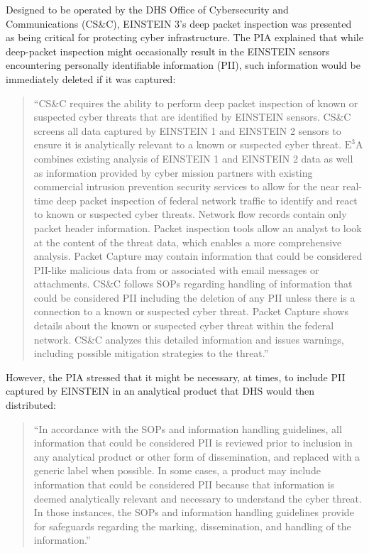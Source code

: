 \documentclass[fleqn,10pt]{wlscirep}
\newcommand{\ETA}{$\textrm{E}^\textrm{3}\textrm{A}$\xspace}
\begin{document}
Designed to be operated by the DHS Office of Cybersecurity and
Communications (CS\&C), EINSTEIN 3's deep packet inspection was
presented as being critical for protecting cyber infrastructure. The
PIA explained that while deep-packet inspection might occasionally
result in the EINSTEIN sensors encountering personally identifiable
information (PII), such information would be immediately deleted if
it was captured:

\begin{quote}
  ``CS\&C requires the ability to perform deep packet inspection of known or
suspected cyber threats that are identified by EINSTEIN sensors. CS\&C screens all data
captured by EINSTEIN 1 and EINSTEIN 2 sensors to ensure it is analytically relevant to
a known or suspected cyber threat. \ETA combines existing analysis of EINSTEIN 1 and
EINSTEIN 2 data as well as information provided by cyber mission partners with
existing commercial intrusion prevention security services to allow for the near real-time
deep packet inspection of federal network traffic to identify and react to known or
suspected cyber threats. Network flow records contain only packet header information.
Packet inspection tools allow an analyst to look at the content of the threat data, which
enables a more comprehensive analysis. Packet Capture may contain information that
could be considered PII-like malicious data from or associated with email messages or
attachments. CS\&C follows SOPs regarding handling of information that could be
considered PII including the deletion of any PII unless there is a connection to a known
or suspected cyber threat. Packet Capture shows details about the known or suspected
cyber threat within the federal network. CS\&C analyzes this detailed information and
issues warnings, including possible mitigation strategies to the threat.''\cite[p.9]{dhs-e3a-pia}
\end{quote}

However, the PIA stressed that it might be necessary, at times, to
include PII captured by EINSTEIN in an analytical product that DHS
would then distributed:

\begin{quote}
  ``In accordance with the SOPs and information handling guidelines, all information
that could be considered PII is reviewed prior to inclusion in any analytical product or
other form of dissemination, and replaced with a generic label when possible. In some
cases, a product may include information that could be considered PII because that
information is deemed analytically relevant and necessary to understand the cyber threat.
In those instances, the SOPs and information handling guidelines provide for safeguards
regarding the marking, dissemination, and handling of the
information.''\cite[p.9]{dhs-e3a-pia}
\end{quote}
\end{document}
